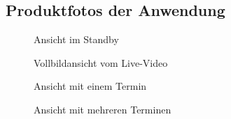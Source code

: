 \subsection{Produktfotos der Anwendung}
\label{Produktfotos}
\begin{figure}[htb]
\centering
{}
\caption{Ansicht im Standby}
\end{figure}
\clearpage
\begin{figure}[htb]
    \centering
    \caption{Vollbildansicht vom Live-Video}
\end{figure}
\clearpage
\begin{figure}[htb]
    \centering
    \caption{Ansicht mit einem Termin}
\end{figure}
\clearpage
\begin{figure}[htb]
    \centering
    \caption{Ansicht mit mehreren Terminen}
\end{figure}
\clearpage
